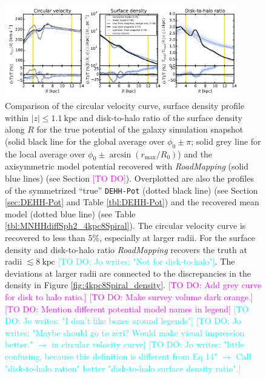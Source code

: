 \documentclass[iop,revtex4,numberedappendix,appendixfloats]{emulateapj}
\newcommand{\RM}{{\sl RoadMapping}}
\newcommand{\Wilma}[1]{\textcolor{Magenta}{#1}}
\newcommand{\Jo}[1]{\textcolor{Cyan}{#1}}
\begin{document}
\begin{figure}[!htbp]
\centering
\includegraphics[width=0.9\textwidth]{fig/MNdHHdiffSph2_4kpc8Spiral_a_test1_vcirc_surfdens_overview.pdf}
\caption{Comparison of the circular velocity curve, surface density profile within $|z|\leq1.1~\text{kpc}$ and disk-to-halo ratio of the surface density along $R$ for the true potential of the galaxy simulation snapshot (solid black line for the global average over $\phi_0\pm\pi$; solid grey line for the local average over $\phi_0\pm \arcsin(r_\text{max}/R_0)$) and the axisymmetric model potential recovered with \RM{} (solid blue lines) (see Section \Wilma{[TO DO]}). Overplotted are also the profiles of the symmetrized ``true'' \texttt{DEHH-Pot} (dotted black line) (see Section \ref{sec:DEHH-Pot} and Table \ref{tbl:DEHH-Pot}) and the recovered mean model (dotted blue line) (see Table \ref{tbl:MNHHdiffSph2_4kpc8Spiral}). The circular velocity curve is recovered to less than $5\%$, especially at larger radii. For the surface density and disk-to-halo ratio \RM{} recovers the truth at radii $\lesssim 8~\text{kpc}$ \Jo{[TO DO: Jo writes: "Not for disk-to-halo"]}. The deviations at larger radii are connected to the discrepancies in the density in Figure \ref{fig:4kpc8Spiral_density}. \Wilma{[TO DO: Add grey curve for disk to halo ratio.]} \Wilma{[TO DO: Make survey volume dark orange.]} \Wilma{[TO DO: Mention different potential model names in legend]} \Jo{[TO DO: Jo writes: "I don't like boxes around legends"]} \Jo{[TO DO: Jo writes: "Maybe should go to zeri? Would make visual impression better." $\longrightarrow$  in circular velocity curve]} \Jo{[TO DO: Jo writes: "little confusing, because this definition is different from Eq 14" $\longrightarrow$ Call "disk-to-halo ration" better "disk-to-halo surface density ratio".]}}
\label{fig:4kpc8Spiral_vcirc_surfdens}
\end{figure}
\end{document}
